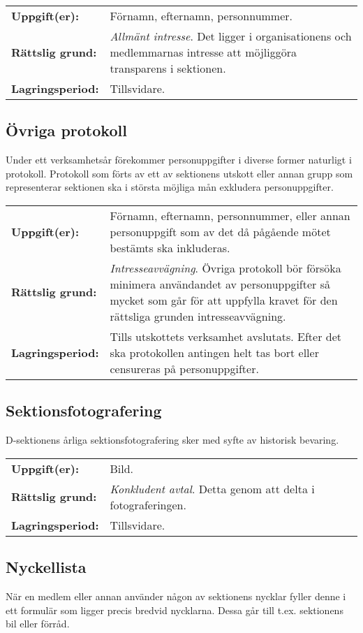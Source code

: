 \documentclass{datateknologsektionen-document}
\begin{document}
\begin{longtabu}{l X}
  \textbf{Uppgift(er):}    & Förnamn, efternamn, personnummer. \\
  \textbf{Rättslig grund:} & \textit{Allmänt intresse}. Det ligger i organisationens och medlemmarnas intresse att
  möjliggöra transparens i sektionen.\\
  \textbf{Lagringsperiod:} & Tillsvidare.
\end{longtabu}

\subsection{Övriga protokoll}
Under ett verksamhetsår förekommer personuppgifter i diverse former naturligt i protokoll.
Protokoll som förts av ett av sektionens utskott eller annan grupp som representerar sektionen
ska i största möjliga mån exkludera personuppgifter.

\begin{longtabu}{l X}
  \textbf{Uppgift(er):}    & Förnamn, efternamn, personnummer, eller annan personuppgift som av det då pågående mötet bestämts ska inkluderas. \\
  \textbf{Rättslig grund:} & \textit{Intresseavvägning}. Övriga protokoll bör försöka minimera användandet av personuppgifter så mycket som går för att uppfylla kravet för den rättsliga grunden intresseavvägning.\\
  \textbf{Lagringsperiod:} & Tills utskottets verksamhet avslutats. Efter det ska protokollen antingen helt tas bort eller censureras på personuppgifter.
\end{longtabu}

\subsection{Sektionsfotografering}
D-sektionens årliga sektionsfotografering sker med syfte av historisk bevaring.

\begin{longtabu}{l X}
  \textbf{Uppgift(er):}    & Bild. \\
  \textbf{Rättslig grund:} & \textit{Konkludent avtal}. Detta genom att delta i fotograferingen.\\
  \textbf{Lagringsperiod:} & Tillsvidare.
\end{longtabu}

\subsection{Nyckellista}
När en medlem eller annan använder någon av sektionens nycklar fyller denne i ett formulär som ligger precis bredvid nycklarna. Dessa går till t.ex. sektionens bil eller förråd.
\end{document}
